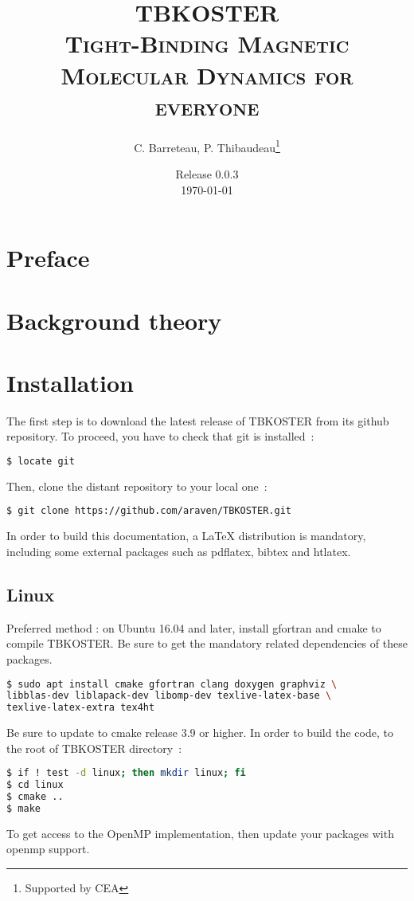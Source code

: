 \documentclass[12pt, onecolumn]{memoir}
\title{{\textbf{\huge\textcolor{nicered}{TBKOSTER}}} \\ \textsc{\small Tight-Binding Magnetic Molecular Dynamics for everyone}}
\author{C. Barreteau, P. Thibaudeau\thanks{Supported by CEA}}
\date{Release 0.0.3\\ \today}
\begin{document}
\frontmatter
\maketitle
\begin{abstract}
\end{abstract}
\tableofcontents*
\chapter*{Preface}
\mainmatter
\chapter{Background theory}
\chapter{Installation}
The first step is to download the latest release of TBKOSTER from its github repository. To proceed, you have to check that git is installed~:
\begin{lstlisting}[language=bash,basicstyle=\small]
$ locate git
\end{lstlisting}
Then, clone the distant repository to your local one~:
\begin{lstlisting}[language=bash,basicstyle=\small]
$ git clone https://github.com/araven/TBKOSTER.git
\end{lstlisting}
In order to build this documentation, a LaTeX distribution is mandatory, including some external packages such as pdflatex, bibtex and htlatex.
\section{Linux}
Preferred method : on Ubuntu 16.04 and later, install gfortran and cmake to compile TBKOSTER. Be sure to get the mandatory related dependencies of these packages.
\begin{lstlisting}[language=sh,basicstyle=\small]
$ sudo apt install cmake gfortran clang doxygen graphviz \
libblas-dev liblapack-dev libomp-dev texlive-latex-base \
texlive-latex-extra tex4ht
\end{lstlisting}
Be sure to update to cmake release 3.9 or higher.
In order to build the code, to the root of TBKOSTER directory~:
\begin{lstlisting}[language=sh,basicstyle=\small]
$ if ! test -d linux; then mkdir linux; fi
$ cd linux
$ cmake ..
$ make
\end{lstlisting}
To get access to the OpenMP implementation, then update your packages with openmp support.
\end{document}
